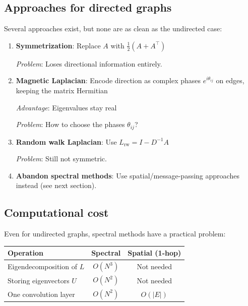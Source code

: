 \begin{notechapter}
\subsection{Approaches for directed graphs}

Several approaches exist, but none are as clean as the undirected case:

\begin{enumerate}
    \item \textbf{Symmetrization}: Replace $A$ with
          $\frac{1}{2}(A + A^\top)$

          \emph{Problem}: Loses directional information entirely.

    \item \textbf{Magnetic Laplacian}: Encode direction as complex
          phases $e^{i\theta_{ij}}$ on edges, keeping the matrix
          Hermitian

          \emph{Advantage}: Eigenvalues stay real

          \emph{Problem}: How to choose the phases $\theta_{ij}$?

    \item \textbf{Random walk Laplacian}: Use $L_{\text{rw}} = I - D^{-1}A$

          \emph{Problem}: Still not symmetric.

    \item \textbf{Abandon spectral methods}: Use spatial/message-passing
          approaches instead (see next section).
\end{enumerate}

\subsection{Computational cost}

Even for undirected graphs, spectral methods have a practical problem:

\begin{center}
\begin{tabular}{lcc}
\toprule
Operation & Spectral & Spatial (1-hop) \\
\midrule
Eigendecomposition of $L$ & $O(N^3)$ & Not needed \\
Storing eigenvectors $U$ & $O(N^2)$ & Not needed \\
One convolution layer & $O(N^2)$ & $O(|E|)$ \\
\bottomrule
\end{tabular}
\end{center}


\end{notechapter}
